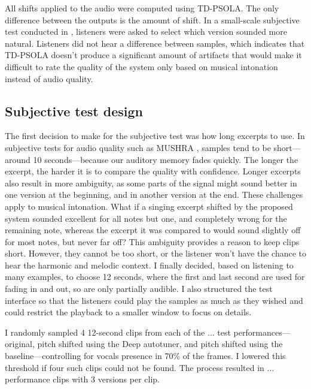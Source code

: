 All shifts applied to the audio were computed using TD-PSOLA. The only difference between the outputs is the amount of shift. In a small-scale subjective test conducted in \cite{wager2020deep}, listeners were asked to select which version sounded more natural. Listeners did not hear a difference between samples, which indicates that TD-PSOLA doesn't produce a significant amount of artifacts that would make it difficult to rate the quality of the system only based on musical intonation instead of audio quality.

\subsection{Subjective test design}
The first decision to make for the subjective test was how long excerpts to use. In subjective tests for audio quality such as MUSHRA \cite{mushra}, samples tend to be short---around 10 seconds---because our auditory memory fades quickly. The longer the excerpt, the harder it is to compare the quality with confidence. Longer excerpts also result in more ambiguity, as some parts of the signal might sound better in one version at the beginning, and in another version at the end. These challenges apply to musical intonation. What if a singing excerpt shifted by the proposed system sounded excellent for all notes but one, and completely wrong for the remaining note, whereas the excerpt it was compared to would sound slightly off for most notes, but never far off? This ambiguity provides a reason to keep clips short. However, they cannot be too short, or the listener won't have the chance to hear the harmonic and melodic context. I finally decided, based on listening to many examples, to choose 12 seconds, where the first and last second are used for fading in and out, so are only partially audible. I also structured the test interface so that the listeners could play the samples as much as they wished and could restrict the playback to a smaller window to focus on details. %

I randomly sampled 4 12-second clips from each of the ... test performances---original, pitch shifted using the Deep autotuner, and pitch shifted using the baseline---controlling for vocals presence in 70\% of the frames. I lowered this threshold if four such clips could not be found. The process resulted in ...  performance clips with 3 versions per clip. 

